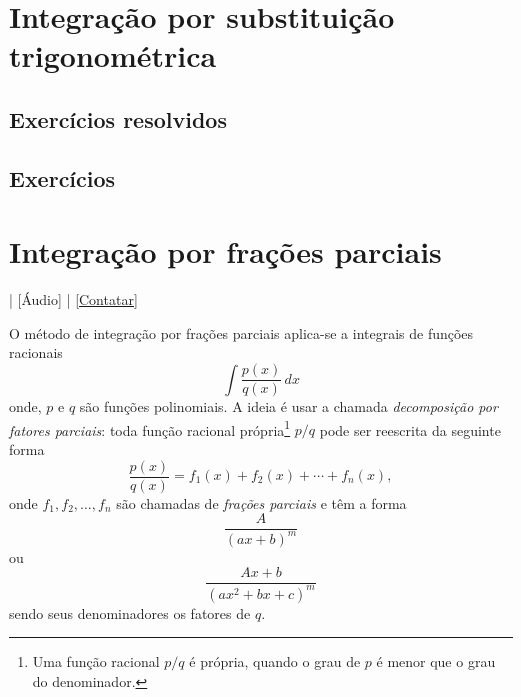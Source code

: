 \section{Integração por substituição trigonométrica}\label{cap_int_sec_substrigo}

\emconstrucao

\subsection*{Exercícios resolvidos}

\emconstrucao

\subsection*{Exercícios}

\emconstrucao

\section{Integração por frações parciais}\label{cap_int_sec_frapar}

\begin{flushright}
  [Vídeo] | [Áudio] | \href{https://phkonzen.github.io/notas/contato.html}{[Contatar]}
\end{flushright}

O método de integração por frações parciais aplica-se a integrais de funções racionais
\begin{equation}
  \int \frac{p(x)}{q(x)}\,dx
\end{equation}
onde, $p$ e $q$ são funções polinomiais. A ideia é usar a chamada \emph{decomposição por fatores parciais}: toda função racional própria\footnote{Uma função racional $p/q$ é própria, quando o grau de $p$ é menor que o grau do denominador.} $p/q$ pode ser reescrita da seguinte forma
\begin{equation}
  \frac{p(x)}{q(x)} = f_1(x) + f_2(x) + \cdots + f_n(x),
\end{equation}
onde $f_1, f_2, \dotsc, f_n$ são chamadas de \emph{frações parciais} e têm a forma
\begin{equation}
  \frac{A}{(ax + b)^m}
\end{equation}
ou
\begin{equation}
  \frac{Ax + b}{(ax^2 + bx + c)^m}
\end{equation}
sendo seus denominadores os fatores de $q$.

